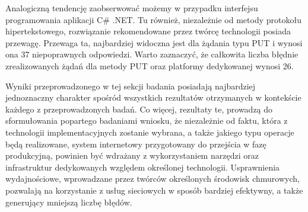 Analogiczną tendencję zaobserwować możemy w przypadku interfejsu programowania aplikacji C\# .NET. Tu również, niezależnie od metody protokołu hipertekstowego, rozwiązanie rekomendowane przez twórcę technologii posiada przewagę. Przewaga ta, najbardziej widoczna jest dla żądania typu PUT i wynosi ona 37 niepoprawnych odpowiedzi. Warto zaznaczyć, że całkowita liczba błędnie zrealizowanych żądań dla metody PUT oraz platformy dedykowanej wynosi 26.

Wyniki przeprowadzonego w tej sekcji badania posiadają najbardziej jednoznaczny charakter spośród wszystkich rezultatów otrzymanych w kontekście każdego z przeprowadzonych badań. Co więcej, rezultaty te, prowadzą do sformułowania popartego badaniami wniosku, że niezależnie od faktu, która z technologii implementacyjnych zostanie wybrana, a także jakiego typu operacje będą realizowane, system internetowy przygotowany do przejścia w fazę produkcyjną, powinien być wdrażany z wykorzystaniem narzędzi oraz infrastruktur dedykowanych względem określonej technologii. Usprawnienia wydajnościowe, wprowadzane przez twórców określonych środowisk chmurowych, pozwalają na korzystanie z usług sieciowych w sposób bardziej efektywny, a także generujący mniejszą liczbę błędów.